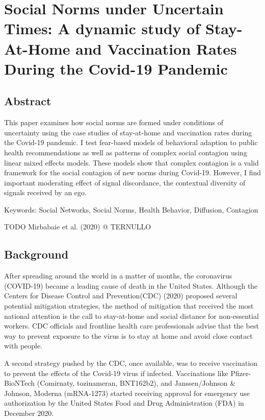 \hypertarget{paper-3}{%
\chapter{Social Norms under Uncertain Times: A dynamic study of Stay-At-Home and Vaccination Rates During the Covid-19 Pandemic}\label{paper-3}}

\hypertarget{abstract-1}{%
\section{Abstract}\label{abstract-1}}

This paper examines how social norms are formed under conditions of uncertainty
using the case studies of stay-at-home and vaccination rates during the Covid-19
pandemic. I test fear-based models of behavioral adaption to public health
recommendations as well as patterns of complex social contagion using linear
mixed effects models. These models show that complex contagion is a valid
framework for the social contagion of new norms during Covid-19. However, I find
important moderating effect of signal discordance, the contextual diversity of
signals received by an ego.

Keywords: Social Networks, Social Norms, Health Behavior, Diffusion, Contagion

TODO
Mirbabaie et al. (2020)
@ TERNULLO

\hypertarget{background}{%
\section{Background}\label{background}}

After spreading around the world in a matter of months, the coronavirus
(COVID-19) became a leading cause of death in the United States. Although the
Centers for Disease Control and Prevention(CDC)
(2020) proposed several potential
mitigation strategies, the method of mitigation that received the most national
attention is the call to stay-at-home and social distance for non-essential
workers. CDC officials and frontline health care professionals advise that the
best way to prevent exposure to the virus is to stay at home and avoid close
contact with people.

A second strategy pushed by the CDC, once available, was to receive vaccination
to prevent the effects of the Covid-19 virus if infected. Vaccinations like
Pfizer-BioNTech (Comirnaty, tozinameran, BNT162b2), and Janssen/Johnson \&
Johnson, Moderna (mRNA-1273) started receiving approval for emergency use
authorization by the United States Food and Drug Administration (FDA) in
December 2020.

